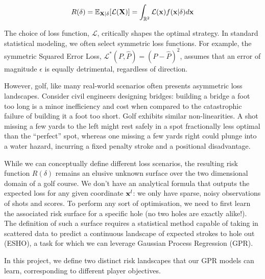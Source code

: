 \documentclass[11pt, letterpaper]{article}
\begin{document}
$$R(\delta) = \mathbb{E}_{\mathbf{X}|\delta}[\mathcal{L}(\mathbf{X})] = \int_{\mathbb{R}^2}\mathcal{L}(\mathbf{x})f(\mathbf{x} | \delta)d\mathbf{x}$$

The choice of loss function, $\mathcal{L}$, critically shapes the optimal strategy. In standard statistical modeling, we often select symmetric loss functions. For example, the symmetric Squared Error Loss, $\mathcal{L}^*(P, \hat{P}) = (P - \hat{P})^2 $, assumes that an error of magnitude $\epsilon$ is equally detrimental, regardless of direction. 

However, golf, like many real-world scenarios often presents asymmetric loss landscapes. Consider civil engineers designing bridges: building a bridge a foot too long is a minor inefficiency and cost when compared to the catastrophic failure of building it a foot too short. Golf exhibits similar non-linearities. A shot missing a few yards to the left might rest safely in a spot fractionally less optimal than the ``perfect'' spot, whereas one missing a few yards right could plunge into a water hazard, incurring a fixed penalty stroke and a positional disadvantage.

While we can conceptually define different loss scenarios, the resulting risk function $R(\delta)$ remains an elusive unknown surface over the two dimensional domain of a golf course. We don't have an analytical formula that outputs the expected loss for any given coordinate $\mathbf{x}^l$: we only have sparse, noisy observations of shots and scores. To perform any sort of optimisation, we need to first learn the associated risk surface for a specific hole (no two holes are exactly alike!). The definition of such a surface requires a statistical method capable of taking in scattered data to predict a continuous landscape of expected strokes to hole out (ESHO), a task for which we can leverage Gaussian Process Regression (GPR). 

In this project, we define two distinct risk landscapes that our GPR models can learn, corresponding to different player objectives.
\end{document}
